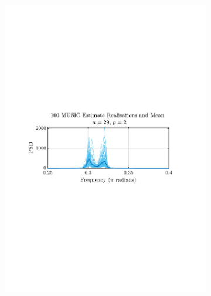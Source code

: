 \documentclass[12pt]{article}
\begin{document}
\begin{figure}[H]
\begin{subfigure}{0.49\textwidth}
			\includegraphics[trim={2.2cm 11cm 3.15cm  11.2cm}, clip, width=\textwidth]{../MATLAB/figures/q1_3e_fig03.pdf} 
		\end{subfigure}
		\begin{subfigure}{0.49\textwidth}
			\centering

\end{subfigure}
\end{figure}
\end{document}
